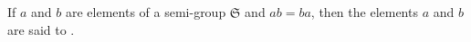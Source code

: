If $a$ and $b$ are elements of a semi-group $\mathfrak{S}$ and $ab = ba$, then the elements $a$ and $b$ are said to .

